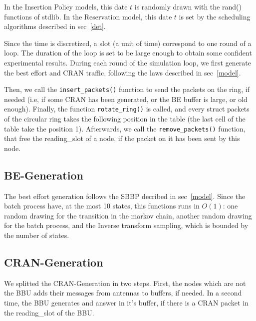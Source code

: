 \documentclass[a4paper,10pt]{article}
\begin{document}
	 In the Insertion Policy models, this date $t$ is randomly drawn with the rand() functions of stdlib. In the Reservation model, this date $t$ is set by the scheduling algorithms described in sec~\ref{det}.
	
	Since the time is discretized, a slot (a unit of time) correspond to one round of a loop. The duration of the loop is set to be large enough to obtain some confident experimental results. During each round of the simulation loop, we first generate the best effort and CRAN traffic, following the laws described in sec~\ref{model}.
	
	Then, we call the \texttt{insert\_packets()} function to send the packets on the ring, if needed (i.e, if some CRAN has been generated, or the BE buffer is large, or old enough).
	Finally, the function \texttt{rotate\_ring()} is called, and every struct packets of the circular ring takes the following position in the table (the last cell of the table take the position 1).
	Afterwards, we call the \texttt{remove\_packets()} function, that free the reading\_slot of a node, if the packet on it has been sent by this node.
	\subsection{BE-Generation}
	The best effort generation follows the SBBP decribed in sec~\ref{model}. Since the batch process have, at the most 10 states, this functions runs in $O(1)$: one random drawing for the transition in the markov chain, another random drawing for the batch process, and the Inverse transform sampling, which is bounded by the number of states.
	\subsection{CRAN-Generation}
	We splitted the CRAN-Generation in two steps. First, the nodes which are not the BBU adds their messages from antennas to buffers, if needed. In a second time, the BBU generates and answer in it's buffer, if there is a CRAN packet in the reading\_slot of the BBU.
\end{document}
